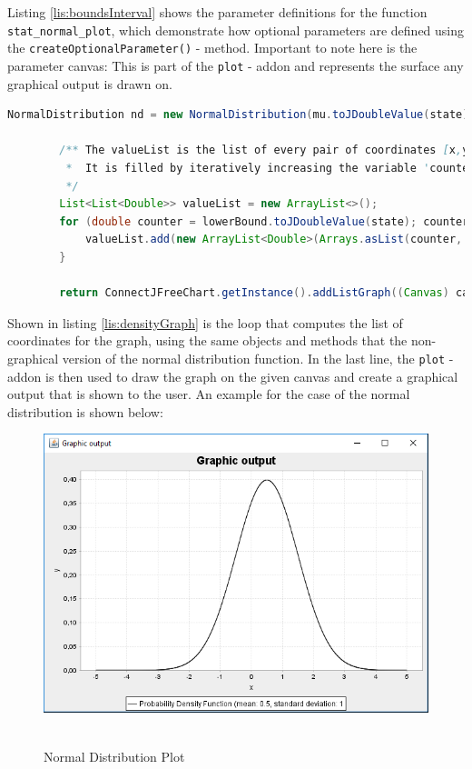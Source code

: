Listing \ref{lis:boundsInterval} shows the parameter definitions for the function \lstinline{stat_normal_plot}, which demonstrate how optional parameters are defined using the \lstinline{createOptionalParameter()} - method. Important to note here is the parameter canvas: This is part of the \lstinline{plot} - addon and represents the surface any graphical output is drawn on.

\begin{center}
	\begin{lstlisting}[caption={Computation of propability density graph for Normal Distributions}, language={java}, label=lis:densityGraph]
		NormalDistribution nd = new NormalDistribution(mu.toJDoubleValue(state), sigma.toJDoubleValue(state));

        /** The valueList is the list of every pair of coordinates [x,y] that the graph consists of.
         *  It is filled by iteratively increasing the variable 'counter' (x), and calculating the density for every new value of 'counter' (y).
         */
        List<List<Double>> valueList = new ArrayList<>();
        for (double counter = lowerBound.toJDoubleValue(state); counter < upperBound.toJDoubleValue(state); counter += interval.toJDoubleValue(state)) {
            valueList.add(new ArrayList<Double>(Arrays.asList(counter, nd.density(counter))));
        }

        return ConnectJFreeChart.getInstance().addListGraph((Canvas) canvas, valueList, "Probability Density Function (mean: " + mu.toString() + ", standard deviation: " + sigma.toString(), Defaults.DEFAULT_COLOR_SCHEME, false);
	\end{lstlisting}
\end{center}

Shown in listing \ref{lis:densityGraph} is the loop that computes the list of coordinates for the graph, using the same objects and methods that the non-graphical version of the normal distribution function. In the last line, the \lstinline{plot} - addon is then used to draw the graph on the given canvas and create a graphical output that is shown to the user. An example for the case of the normal distribution is shown below:

\begin{figure}[h]
    \centering
    \includegraphics[width=1\textwidth]{Figures/implemented_functions/normal_pdf}~\\
    \caption{Normal Distribution Plot}
    \label{fig:normalDistPlot}
\end{figure}